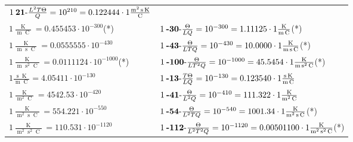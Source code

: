 \begin{center}
\begin{longtable}{l l}
	{\color{black}$1\:\text{\textbf{21}-} \frac{L^2T\Theta}{Q}=10^{210} = 0.122444 \cdot 1 \bm{\mathrm{ }}\frac{\operatorname{m}^2\operatorname{s}\operatorname{K}}{\operatorname{C}}$}\\
{\color{black}$1 \bm{\mathrm{ }}\frac{\operatorname{K}}{\operatorname{m}\operatorname{C}} = 0.455453\cdot10^{-300} $}\quad(*)&
	{\color{black}$1\:\text{\textbf{-30}-} \frac{\Theta}{LQ}=10^{-300} = 1.11125 \cdot 1 \bm{\mathrm{ }}\frac{\operatorname{K}}{\operatorname{m}\operatorname{C}}$}\quad(*)\\
{\color{black}$1 \bm{\mathrm{ }}\frac{\operatorname{K}}{\operatorname{m}\operatorname{s}\operatorname{C}} = 0.0555555\cdot10^{-430} $}&
	{\color{black}$1\:\text{\textbf{-43}-} \frac{\Theta}{LTQ}=10^{-430} = 10.0000 \cdot 1 \bm{\mathrm{ }}\frac{\operatorname{K}}{\operatorname{m}\operatorname{s}\operatorname{C}}$}\quad(*)\\
{\color{black}$1 \bm{\mathrm{ }}\frac{\operatorname{K}}{\operatorname{m}\operatorname{s}^2\operatorname{C}} = 0.0111124\cdot10^{-1000} $}\quad(*)&
	{\color{black}$1\:\text{\textbf{-100}-} \frac{\Theta}{LT^2Q}=10^{-1000} = 45.5454 \cdot 1 \bm{\mathrm{ }}\frac{\operatorname{K}}{\operatorname{m}\operatorname{s}^2\operatorname{C}}$}\quad(*)\\
{\color{black}$1 \bm{\mathrm{ }}\frac{\operatorname{s}\operatorname{K}}{\operatorname{m}\operatorname{C}} = 4.05411\cdot10^{-130} $}&
	{\color{black}$1\:\text{\textbf{-13}-} \frac{T\Theta}{LQ}=10^{-130} = 0.123540 \cdot 1 \bm{\mathrm{ }}\frac{\operatorname{s}\operatorname{K}}{\operatorname{m}\operatorname{C}}$}\\
{\color{black}$1 \bm{\mathrm{ }}\frac{\operatorname{K}}{\operatorname{m}^2\operatorname{C}} = 4542.53\cdot10^{-420} $}&
	{\color{black}$1\:\text{\textbf{-41}-} \frac{\Theta}{L^2Q}=10^{-410} = 111.322 \cdot 1 \bm{\mathrm{ }}\frac{\operatorname{K}}{\operatorname{m}^2\operatorname{C}}$}\\
{\color{black}$1 \bm{\mathrm{ }}\frac{\operatorname{K}}{\operatorname{m}^2\operatorname{s}\operatorname{C}} = 554.221\cdot10^{-550} $}&
	{\color{black}$1\:\text{\textbf{-54}-} \frac{\Theta}{L^2TQ}=10^{-540} = 1001.34 \cdot 1 \bm{\mathrm{ }}\frac{\operatorname{K}}{\operatorname{m}^2\operatorname{s}\operatorname{C}}$}\quad(*)\\
{\color{black}$1 \bm{\mathrm{ }}\frac{\operatorname{K}}{\operatorname{m}^2\operatorname{s}^2\operatorname{C}} = 110.531\cdot10^{-1120} $}&
	{\color{black}$1\:\text{\textbf{-112}-} \frac{\Theta}{L^2T^2Q}=10^{-1120} = 0.00501100 \cdot 1 \bm{\mathrm{ }}\frac{\operatorname{K}}{\operatorname{m}^2\operatorname{s}^2\operatorname{C}}$}\quad(*)\\

\end{longtable}
\end{center}
